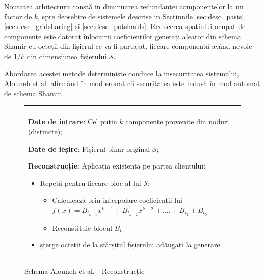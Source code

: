 \documentclass[oneside, 12pt]{book}
\begin{document}
Noutatea arhitecturii constă in diminuarea redundanței componentelor la un factor de $k$, spre deosebire de sistemele descrise in Secțiunile \ref{sec:desc_pasis}, \ref{sec:desc_gridsharing} și \ref{sec:desc_potshards}. Reducerea spațiului ocupat de componente este datorat înlocuirii coeficienților generați aleator din schema Shamir cu octeții din fișierul ce va fi partajat, fiecare componentă având nevoie de $1/k$ din dimensiunea fișierului $\mathcal{S}$.

Abordarea acestei metode deterministe conduce la insecuritatea sistemului, Alouneh et al. afirmând în mod eronat că securitatea este indusă în mod automat de schema Shamir. 

\begin{figure}[h!]

\begin{tabular}{|p{\textwidth}|}
\hline

\\
\hspace{.1in}
\textbf{Date de intrare}: Cel puțin $k$ componente provenite din noduri (distincte);
\medskip

\hspace{.1in}
\textbf{Date de ieșire}: Fișierul binar original $\mathcal{S}$;
\medskip

\hspace{.1in}
\textbf{Reconstrucție}: Aplicația existenta pe partea clientului: 
	\begin{itemize}
		\item Repetă pentru fiecare bloc al lui $\mathcal{S}$:
		\begin{itemize}
			\item Calculează prin interpolare coeficienții lui $f(x)=B_{t_{k - 1}}x ^ {k-1} + B_{t_{k - 2}}x ^ {k - 2} + .... + B_{t_1} + B_{t_0}$
			\item Reconstituie blocul $B_t$
		\end{itemize}
		\item șterge octeții de la sfârșitul fișierului adăugați la generare. 
	\end{itemize}

\\
\hline
\end{tabular}
\caption{Schema Alouneh et al. - Reconstrucție \cite{AAMK:2013}}
\label{fig:alouneh_reconstruction}
\end{figure}

\end{document}
